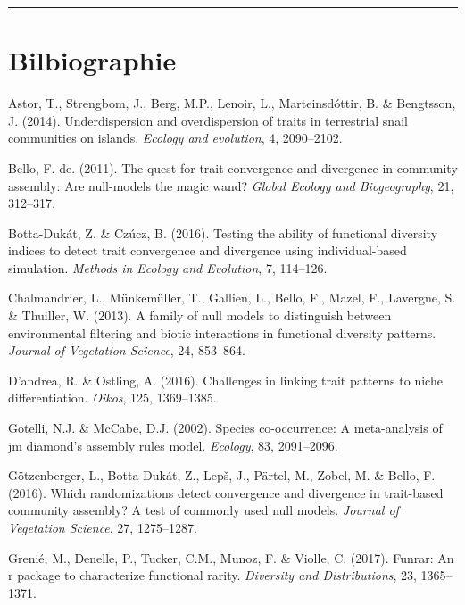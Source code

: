 \documentclass[]{article}
\begin{document}
\begin{center}\rule{0.5\linewidth}{\linethickness}\end{center}

\section*{Bilbiographie}\label{bilbiographie}

\hypertarget{refs}{}
\hypertarget{ref-astor2014trait_dispersion}{}
Astor, T., Strengbom, J., Berg, M.P., Lenoir, L., Marteinsdóttir, B. \&
Bengtsson, J. (2014). Underdispersion and overdispersion of traits in
terrestrial snail communities on islands. \emph{Ecology and evolution},
4, 2090--2102.

\hypertarget{ref-de_Bello_2011}{}
Bello, F. de. (2011). The quest for trait convergence and divergence in
community assembly: Are null-models the magic wand? \emph{Global Ecology
and Biogeography}, 21, 312--317.

\hypertarget{ref-botta_dukat2016}{}
Botta-Dukát, Z. \& Czúcz, B. (2016). Testing the ability of functional
diversity indices to detect trait convergence and divergence using
individual-based simulation. \emph{Methods in Ecology and Evolution}, 7,
114--126.

\hypertarget{ref-chalmandrier2013}{}
Chalmandrier, L., Münkemüller, T., Gallien, L., Bello, F., Mazel, F.,
Lavergne, S. \& Thuiller, W. (2013). A family of null models to
distinguish between environmental filtering and biotic interactions in
functional diversity patterns. \emph{Journal of Vegetation Science}, 24,
853--864.

\hypertarget{ref-dandrea_ostling2016}{}
D'andrea, R. \& Ostling, A. (2016). Challenges in linking trait patterns
to niche differentiation. \emph{Oikos}, 125, 1369--1385.

\hypertarget{ref-gotelli_mccabe2002}{}
Gotelli, N.J. \& McCabe, D.J. (2002). Species co-occurrence: A
meta-analysis of jm diamond's assembly rules model. \emph{Ecology}, 83,
2091--2096.

\hypertarget{ref-gotzenberger2016randomizations}{}
Götzenberger, L., Botta-Dukát, Z., Lepš, J., Pärtel, M., Zobel, M. \&
Bello, F. (2016). Which randomizations detect convergence and divergence
in trait-based community assembly? A test of commonly used null models.
\emph{Journal of Vegetation Science}, 27, 1275--1287.

\hypertarget{ref-grenie2017funrar}{}
Grenié, M., Denelle, P., Tucker, C.M., Munoz, F. \& Violle, C. (2017).
Funrar: An r package to characterize functional rarity. \emph{Diversity
and Distributions}, 23, 1365--1371.
\end{document}
